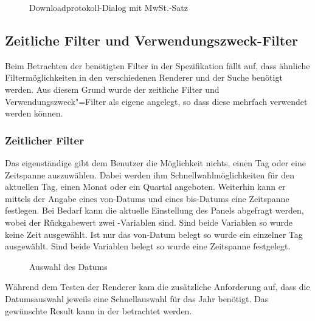 \begin{figure}[htb]
	\centering
	\caption{Downloadprotokoll-Dialog mit MwSt.-Satz}
	\label{fig:alkis-protocol-new}
\end{figure}

\subsection{Zeitliche Filter und Verwendungszweck-Filter}
Beim Betrachten der benötigten Filter in der Spezifikation fällt auf, dass ähnliche Filtermöglichkeiten in den verschiedenen Renderer und der Suche benötigt werden. Aus diesem Grund wurde der zeitliche Filter und Verwendungszweck"=Filter als eigene  angelegt, so dass diese mehrfach verwendet werden können.

\subsubsection{Zeitlicher Filter}
Das eigenständige   gibt dem Benutzer die Möglichkeit nichts, einen Tag oder eine Zeitspanne auszuwählen.
Dabei werden ihm Schnellwahlmöglichkeiten für den aktuellen Tag, einen Monat oder ein Quartal angeboten.
Weiterhin kann er mittels der Angabe eines von-Datums und eines bis-Datums eine Zeitspanne festlegen.
Bei Bedarf kann die aktuelle Einstellung des Panels abgefragt werden, wobei der Rückgabewert zwei -Variablen sind.
Sind beide Variablen  so wurde keine Zeit ausgewählt.
Ist nur das von-Datum belegt so wurde ein einzelner Tag ausgewählt.
Sind beide Variablen belegt so wurde eine Zeitspanne festgelegt.

\begin{wrapfigure}{o}{0.4\textwidth}
  \centering
  \caption{Auswahl des Datums} \label{fig:jxdatepicker} 
\end{wrapfigure}
Während dem Testen der Renderer kam die zusätzliche Anforderung auf, dass die Datumsauswahl jeweils eine Schnellauswahl für das Jahr benötigt.
Das gewünschte Result kann in der  betrachtet werden.


